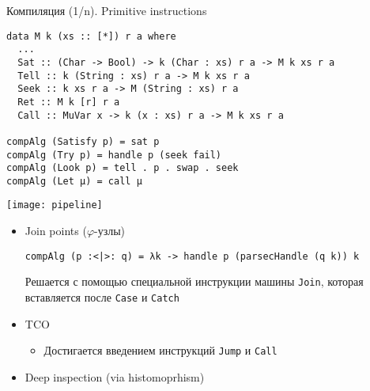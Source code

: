 \documentclass[aspectratio=169
  , xcolor={svgnames}
  , hyperref={ colorlinks,citecolor=Blue
             , linkcolor=DarkRed,urlcolor=DarkBlue}
  , russian
  ]{beamer}
\begin{document}
\begin{frame}[fragile]{Компиляция (1/n). Primitive instructions}

\begin{verbatim}
data M k (xs :: [*]) r a where
  ...
  Sat :: (Char -> Bool) -> k (Char : xs) r a -> M k xs r a
  Tell :: k (String : xs) r a -> M k xs r a
  Seek :: k xs r a -> M (String : xs) r a
  Ret :: M k [r] r a
  Call :: MuVar x -> k (x : xs) r a -> M k xs r a

compAlg (Satisfy p) = sat p
compAlg (Try p) = handle p (seek fail)
compAlg (Look p) = tell . p . swap . seek
compAlg (Let μ) = call μ

\end{verbatim}
\end{frame}

\begin{frame}[fragile]{}
\texttt{[image: pipeline]}
\begin{itemize}
\item Join points ($\varphi$-узлы) 
\begin{verbatim}
compAlg (p :<|>: q) = λk -> handle p (parsecHandle (q k)) k
\end{verbatim}
Решается с помощью специальной инструкции машины \texttt{Join}, которая вставляется после 
\texttt{Case} и \texttt{Catch}
\item TCO
\begin{itemize}
\item Достигается введением инструкций \texttt{Jump} и \texttt{Call}
\end{itemize}
\item Deep inspection (via histomoprhism)
\end{itemize}

\end{frame}
\end{document}
